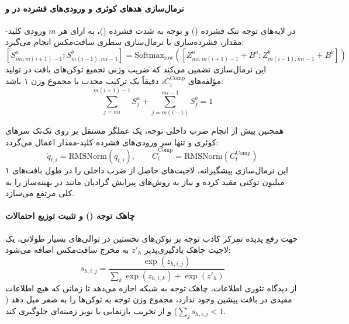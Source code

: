 \paragraph*{نرمال‌سازی هدهای کوئری و ورودی‌های فشرده در  و }
در لایه‌های توجه تنک فشرده () و توجه به شدت فشرده ()، به ازای هر $m$ ورودی کلید-مقدار، فشرده‌سازی با نرمال‌سازی سطری سافت‌مکس انجام می‌گیرد:
\begin{equation}
    \left[ S^a_{mi:m(i+1)-1} ; S^b_{m(i-1):mi-1} \right] = \text{Softmax}_{\text{row}}\left( \left[ Z^a_{mi:m(i+1)-1} + B^a ; Z^b_{m(i-1):mi-1} + B^b \right] \right)
\end{equation}
این نرمال‌سازی تضمین می‌کند که ضریب وزنی تجمیع توکن‌های بافت در تولید مؤلفه‌های $C_i^{\text{Comp}}$، دقیقاً یک ترکیب محدب با مجموع وزن ۱ باشد:
\begin{equation}
    \sum_{j=mi}^{m(i+1)-1} S^a_{j} + \sum_{j=m(i-1)}^{mi-1} S^b_{j} = 1
\end{equation}

همچنین پیش از انجام ضرب داخلی توجه، یک عملگر  مستقل بر روی تک‌تک سرهای کوئری و تنها سرِ ورودی‌های فشرده کلید-مقدار اعمال می‌گردد:
\begin{equation}
    \tilde{q}_{t,i} = \text{RMSNorm}(q_{t,i}), \qquad \tilde{C}^{\text{Comp}}_t = \text{RMSNorm}(C^{\text{Comp}}_t)
\end{equation}
این نرمال‌سازی پیشگیرانه، لاجیت‌های حاصل از ضرب داخلی را در طول بافت‌های ۱ میلیون توکنی مقید کرده و نیاز به روش‌های پیرایش گرادیان مانند  در بهینه‌ساز  را به کلی مرتفع می‌سازد.

\paragraph*{چاهک توجه () و تثبیت توزیع احتمالات}
جهت رفع پدیده تمرکز کاذب توجه بر توکن‌های نخستین در توالی‌های بسیار طولانی، یک لاجیت چاهک یادگیری‌پذیر $z'_h$ به مخرج سافت‌مکس اضافه می‌شود:
\begin{equation}
    s_{h,i,j} = \frac{\exp(z_{h,i,j})}{\sum_k \exp(z_{h,i,k}) + \exp(z'_h)}
\end{equation}
از دیدگاه تئوری اطلاعات، چاهک توجه به شبکه اجازه می‌دهد تا زمانی که هیچ اطلاعات مفیدی در بافت پیشین وجود ندارد، مجموع وزن توجه به توکن‌ها را به صفر میل دهد ($\sum_j s_{h,i,j} < 1$) و از تخریب بازنمایی با نویز زمینه‌ای جلوگیری کند.

